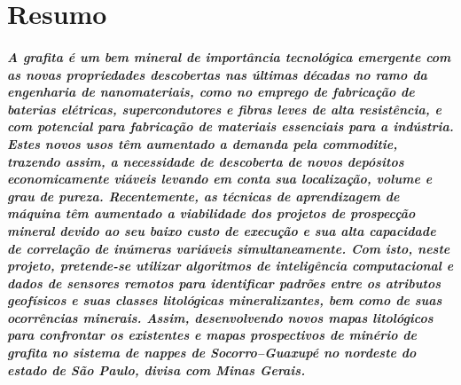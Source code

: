 \chapter*{Resumo} %
\label{chap:Resumo}
\paragraph{A grafita é um bem mineral de importância tecnológica emergente com as novas propriedades descobertas nas últimas décadas no ramo da engenharia de nanomateriais, como no emprego de fabricação de baterias elétricas, supercondutores e fibras leves de alta resistência, e com potencial para fabricação de materiais essenciais para a indústria. Estes novos usos têm aumentado a demanda pela commoditie, trazendo assim, a necessidade de descoberta de novos depósitos economicamente viáveis levando em conta sua localização, volume e grau de pureza. Recentemente, as técnicas de aprendizagem de máquina têm aumentado a viabilidade dos projetos de prospecção mineral devido ao seu baixo custo de execução e sua alta capacidade de correlação de inúmeras variáveis simultaneamente. Com isto, neste projeto, pretende-se utilizar algoritmos de inteligência computacional e dados de sensores remotos para identificar padrões entre os atributos geofísicos e suas classes litológicas mineralizantes, bem como de suas ocorrências minerais. Assim, desenvolvendo novos mapas litológicos para confrontar os existentes e mapas prospectivos de minério de grafita no sistema de nappes de Socorro–Guaxupé no nordeste do estado de São Paulo, divisa com Minas Gerais.}

